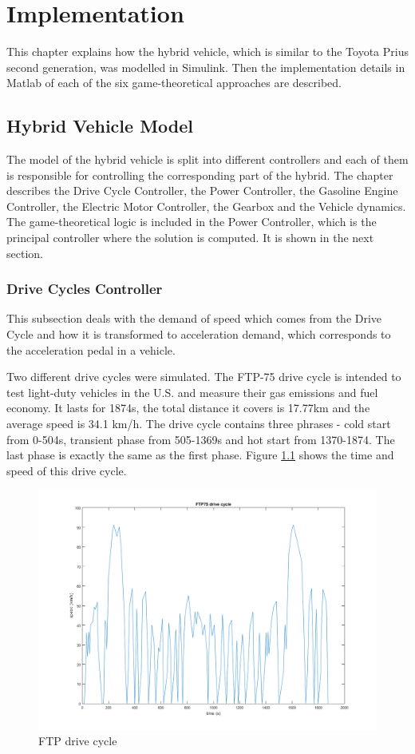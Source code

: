 \chapter{Implementation}
\label{chp:implementation}
This chapter explains how the hybrid vehicle, which is similar to the Toyota Prius second generation, was modelled in Simulink. Then the implementation details in Matlab of each of the six game-theoretical approaches are described.

\section{Hybrid Vehicle Model}
The model of the hybrid vehicle is split into different controllers and each of them is responsible for controlling the corresponding part of the hybrid. The chapter describes the Drive Cycle Controller, the Power Controller, the Gasoline Engine Controller, the Electric Motor Controller, the Gearbox and the Vehicle dynamics. The game-theoretical logic is included in the Power Controller, which is the principal controller where the solution is computed. It is shown in the next section.

\subsection{Drive Cycles Controller}
This subsection deals with the demand of speed which comes from the Drive Cycle and how it is transformed to acceleration demand, which corresponds to the acceleration pedal in a vehicle.

Two different drive cycles were simulated. The FTP-75 drive cycle is intended to test light-duty vehicles in the U.S. and measure their gas emissions and fuel economy. It lasts for 1874s, the total distance it covers is 17.77km and the average speed is 34.1 km/h. The drive cycle contains three phrases - cold start from 0-504s, transient phase from 505-1369s and hot start from 1370-1874. The last phase is exactly the same as the first phase. Figure \ref{fig:ftp75} shows the time and speed of this drive 
cycle.

\begin{figure}[h]
\centering
\includegraphics[scale=0.45]{figures/FTP75}
\caption{FTP drive cycle}
\label{fig:ftp75}
\end{figure}

